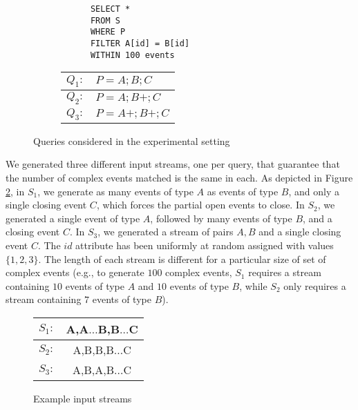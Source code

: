 \begin{figure}[H]
  \centering
  \begin{subfigure}[c]{0.49\textwidth}
    \centering
    \begin{verbatim}
      SELECT *
      FROM S
      WHERE P
      FILTER A[id] = B[id]
      WITHIN 100 events
    \end{verbatim}
  \end{subfigure}
  \begin{subfigure}[t]{0.49\textwidth}
    \begin{tabular}{l l}
      \hline
      $Q_{1}:$ & $P = A;B;C$ \\
      \hline
      $Q_{2}:$ & $P = A;B+;C$ \\
      \hline
      $Q_{3}:$ & $P = A+;B+;C$ \\
      \hline
    \end{tabular}
  \end{subfigure}
  \caption{Queries considered in the experimental setting}\label{fig:queriesExperiments}
\end{figure}

We generated three different input streams, one per query, that guarantee that the number of complex events matched is the same in each. As depicted in Figure \ref{fig:sampleStream}, in $S_{1}$, we generate as many events of type $A$ as events of type $B$, and only a single closing event $C$, which forces the partial open events to close. In $S_{2}$, we generated a single event of type $A$, followed by many events of type $B$, and a closing event $C$. In $S_{3}$, we generated a stream of pairs $A, B$ and a single closing event $C$. The $id$ attribute has been uniformly at random assigned with values $\{1, 2, 3\}$. The length of each stream is different for a particular size of set of complex events (e.g., to generate $100$ complex events, $S_{1}$ requires a stream containing $10$ events of type $A$ and $10$ events of type $B$, while $S_{2}$ only requires a stream containing $7$ events of type $B$).

\begin{figure}[H]
  \centering
  \begin{tabular}{l c}
    \hline
    $S_{1}:$ & A,A$\ldots$B,B$\ldots$C\\
    \hline
    $S_{2}:$ & A,B,B,B$\ldots$C\\
    \hline
    $S_{3}:$ & A,B,A,B$\ldots$C\\
    \hline
  \end{tabular}
  \caption{Example input streams}\label{fig:sampleStream}
\end{figure}

